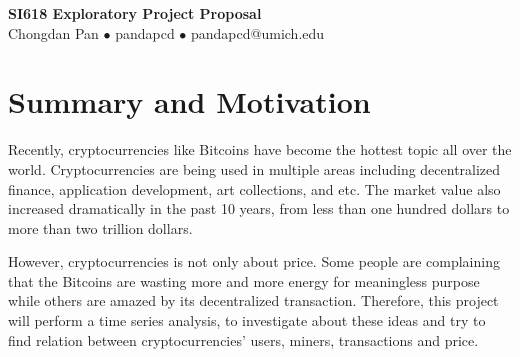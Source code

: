 \documentclass[a4paper]{article}
\begin{document}
\begin{center}
    \Large{\textbf{SI618 Exploratory Project Proposal}}\\
    \large{Chongdan Pan $\bullet$ pandapcd $\bullet$ pandapcd@umich.edu}
\end{center}
\section{Summary and Motivation}
Recently, cryptocurrencies like Bitcoins have become the hottest topic all over the world. Cryptocurrencies are being used in multiple areas including decentralized finance, application development, art collections, and etc. The market value also increased dramatically in the past 10 years, from less than one hundred dollars to more than two trillion dollars.

\par However, cryptocurrencies is not only about price. Some people are complaining that the Bitcoins are wasting more and more energy for meaningless purpose while others are amazed by its decentralized transaction. Therefore, this project will perform a time series analysis, to investigate about these ideas and try to find relation between cryptocurrencies' users, miners, transactions and price.
\end{document}
